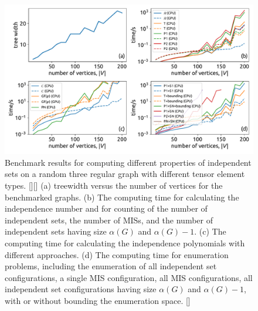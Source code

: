 \documentclass[onefignum, onetabnum]{siamart190516}
\newcommand{\<}{\langle}
\renewcommand{\>}{\rangle}
\newcommand{\red}[1]{[{\bf  \color{red}{ST: #1}}]}
\newcommand{\blue}[1]{[{\bf  \color{blue}{JG: #1}}]}
\begin{document}
\begin{figure} 
    \centering
    \includegraphics[width=\textwidth, trim={0cm 0cm 0cm 0cm}, clip]{figures/fig1.pdf}
    \caption{Benchmark results for computing different properties of independent sets on a random three regular graph with different tensor element types. \red{for each graph size, is there only one graph?}\blue{yes} (a) treewidth versus the number of vertices for the benchmarked graphs. 
    (b) The computing time for calculating the independence number and for counting of the number of independent sets, the number of MISs, and the number of independent sets having size $\alpha(G)$ and $\alpha(G)-1$.
    (c) The computing time for calculating the independence polynomials with different approaches.
    (d) The computing time for enumeration problems, including the enumeration of all independent set configurations, a single MIS configuration, all MIS configurations, all independent set configurations having size $\alpha(G)$ and $\alpha(G)-1$,  with or without bounding the enumeration space.
    \red{suggestions for the figure: 1. the legend seems to overlap the lines, especially the large subfigure. Not sure what's a better way to include the legend there. 2. I see you guys don't typically use markers. We typically use markers to distinguish the different lines, as well as using the color. Especially, for some journals, there is a physical non-color copy, so some requires the figures to be understandable without colors.}
    }
    \label{fig:benchmark}
\end{figure}
\end{document}
